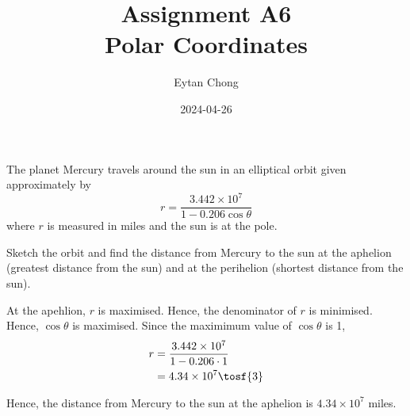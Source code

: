 \documentclass{jhwhw}
\title{Assignment A6\\Polar Coordinates}
\author{Eytan Chong}
\date{2024-04-26}
\begin{document}
    \problem{}
        The planet Mercury travels around the sun in an elliptical orbit given approximately by
        \begin{equation*}
            r = \dfrac{3.442 \times 10^7}{1 - 0.206\cos\theta}
        \end{equation*}
        \noindent where $r$ is measured in miles and the sun is at the pole.

        Sketch the orbit and find the distance from Mercury to the sun at the aphelion (greatest distance from the sun) and at the perihelion (shortest distance from the sun).

    \solution
        \begin{center}
        \end{center}

        At the apehlion, $r$ is maximised. Hence, the denominator of $r$ is minimised. Hence, $\cos \theta$ is maximised. Since the maximimum value of $\cos \theta$ is 1,
        \begin{align*}
            r &= \dfrac{3.442 \times 10^7}{1 - 0.206\cdot1}\\
            &= 4.34 \times 10^7 \tosf{3}
        \end{align*}

        Hence, the distance from Mercury to the sun at the aphelion is $4.34 \times 10^7$ miles.

\end{document}
